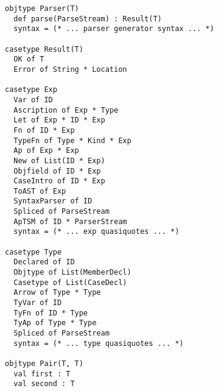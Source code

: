 \begin{figure}[t!]
\begin{lstlisting}[style=wyvern]
objtype Parser(T)
  def parse(ParseStream) : Result(T)
  syntax = (* ... parser generator syntax ... *)

casetype Result(T)
  OK of T
  Error of String * Location

casetype Exp
  Var of ID
  Ascription of Exp * Type
  Let of Exp * ID * Exp
  Fn of ID * Exp
  TypeFn of Type * Kind * Exp
  Ap of Exp * Exp
  New of List(ID * Exp)
  Objfield of ID * Exp
  CaseIntro of ID * Exp
  ToAST of Exp
  SyntaxParser of ID
  Spliced of ParseStream
  ApTSM of ID * ParserStream
  syntax = (* ... exp quasiquotes ... *)

casetype Type
  Declared of ID
  Objtype of List(MemberDecl)
  Casetype of List(CaseDecl)
  Arrow of Type * Type
  TyVar of ID 
  TyFn of ID * Type
  TyAp of Type * Type
  Spliced of ParseStream 
  syntax = (* ... type quasiquotes ... *)

objtype Pair(T, T)
  val first : T
  val second : T
\end{lstlisting}
\label{exp-prelude}
\end{figure}